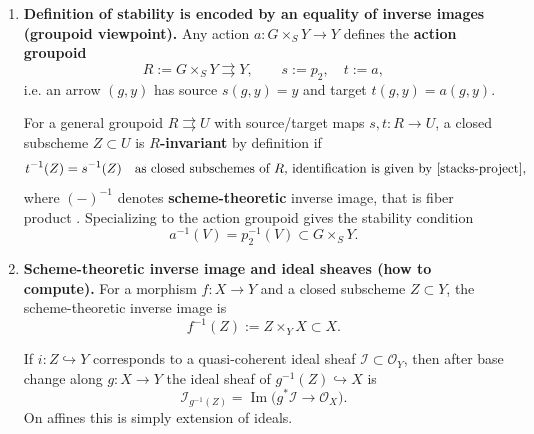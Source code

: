 \begin{remark}
\begin{enumerate}
              In the affine graded model, if $A=\bigoplus_{n\in\mathbf Z}A_n$ a graded $k$-algebra and $Y=\Spec(A)$, the grading
              induces a canonical $\mathbf G_m$-action
              \[
                  a:\mathbf G_m\times_S Y\to Y
              \]
              via the ring map (\textbf{coaction}) \cite[\href{https://stacks.math.columbia.edu/tag/0EKJ}{Tag 0EKJ}]{stacks-project}
              \[
                  \mu:A\to A\otimes_k k[x,x^{-1}],\qquad A_n \ni f\longmapsto f\otimes x^n.
              \]


        \item \textbf{Definition of stability is encoded by an equality of inverse images (groupoid viewpoint).}
              Any action $a:G\times_S Y\to Y$ defines the \textbf{action groupoid}
              \[
                  R:=G\times_S Y \rightrightarrows Y,\qquad s:=p_2,\quad t:=a,
              \]
              i.e. an arrow $(g,y)$ has source $s(g,y)=y$ and target $t(g,y)=a(g,y)$.
              \cite[\href{https://stacks.math.columbia.edu/tag/03LK}{Tag 03LK}, \href{https://stacks.math.columbia.edu/tag/0231}{Tag 0231}]{stacks-project}

              For a general groupoid $R\rightrightarrows U$ with source/target maps $s,t:R\to U$,
              a closed subscheme $Z\subset U$ is \textbf{$R$-invariant} by definition if \cite[\href{https://stacks.math.columbia.edu/tag/03BC}{Tag 03BC}]{stacks-project}
              \[
                  t^{-1}(Z)=s^{-1}(Z)
                  \quad\text{as closed subschemes of $R$, identification is given by \cite[\href{https://stacks.math.columbia.edu/tag/01HO}{Tag 01HO}]{stacks-project}},
              \]
              where $(-)^{-1}$ denotes \textbf{scheme-theoretic} inverse image, that is fiber product \cite[\href{https://stacks.math.columbia.edu/tag/01JV}{Tag 01JV}]{stacks-project}.
              Specializing to the action groupoid gives the stability condition
              \[
                  a^{-1}(V)=p_2^{-1}(V)\subset G\times_S Y.
              \]


        \item \textbf{Scheme-theoretic inverse image and ideal sheaves (how to compute).}
              For a morphism $f:X\to Y$ and a closed subscheme $Z\subset Y$, the scheme-theoretic inverse image is
              \[
                  f^{-1}(Z):=Z\times_Y X\subset X.
              \]

              If $i:Z\hookrightarrow Y$ corresponds to a quasi-coherent ideal sheaf $\mathcal I\subset\mathcal O_Y$,
              then after base change along $g:X\to Y$ the ideal sheaf of $g^{-1}(Z)\hookrightarrow X$ is \cite[\href{https://stacks.math.columbia.edu/tag/01JU}{Tag 01JU}]{stacks-project}
              \[
                  \mathcal I_{g^{-1}(Z)}=\operatorname{Im}\bigl(g^*\mathcal I\to\mathcal O_X\bigr).
              \]
              On affines this is simply extension of ideals.%



\end{enumerate}
\end{remark}
